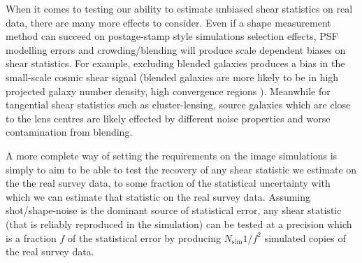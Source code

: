 \documentclass[\docopts]{\docclass}
\begin{document}
When it comes to testing our ability to estimate unbiased shear statistics on real data, there are many more effects to consider. Even if a shape measurement method can succeed on postage-stamp style simulations selection effects, PSF modelling errors and crowding/blending will produce scale dependent biases on shear statistics. For example, excluding blended galaxies produces a bias in the small-scale cosmic shear signal (blended galaxies are more likely to be in high projected galaxy number density, high convergence regions \citep{hartlap2011,maccrann2017}). Meanwhile for tangential shear statistics such as cluster-lensing, source galaxies which are close to the lens centres are likely effected by different noise properties and worse contamination from blending.

A more complete way of setting the requirements on the image simulations is simply to aim to be able to test the recovery of any shear statistic we estimate on the the real survey data, to some fraction of the statistical uncertainty with which we can estimate that statistic on the real survey data. Assuming shot/shape-noise is the dominant source of statistical error, any shear statistic (that is reliably reproduced in the simulation) can be tested at a precision which is a fraction $f$ of the statistical error by producing $N_{\mathrm{sim}}1/f^2$ simulated copies of the real survey data. 
\end{document}
